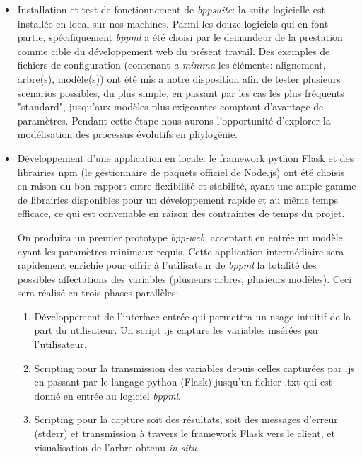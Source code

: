 \begin{itemize}
	\item Installation et test de fonctionnement de \textit{bppsuite}: la suite logicielle est installée en local sur nos machines. 
	Parmi les douze logiciels qui en font partie, spécifiquement   \textit{bppml} a été choisi par le demandeur de la prestation comme cible 
	du développement web du présent travail. Des exemples de fichiers de configuration (contenant \textit{a minima} les éléments: alignement, arbre(s), modèle(s)) 
	ont été mis a notre disposition  
	afin de tester plusieurs scenarios possibles, du plus simple, en passant par les cas les plus fréquents "standard", 
	jusqu'aux modèles plus exigeantes comptant d'avantage de paramètres. Pendant cette étape nous aurons l'opportunité d'explorer
	 la modélisation des processus évolutifs en phylogénie.
	
	\item Développement d'une application en locale: le framework python Flask et des librairies npm
	(le gestionnaire de paquets officiel de Node.js) 
	ont été choisis en raison du bon rapport entre flexibilité et stabilité, 
	ayant une ample gamme de librairies disponibles pour un développement rapide et au même temps efficace, 
	ce qui est convenable en raison des contraintes de temps du projet.

	On produira un premier prototype  \textit{bpp-web}, acceptant en entrée un modèle ayant les paramètres minimaux requis. 
	Cette application intermédiaire sera rapidement enrichie pour offrir à l'utilisateur de \textit{bppml} la totalité des possibles affectations 
	des variables (plusieurs arbres, plusieurs modèles).
	Ceci sera réalisé en trois phases parallèles:
	\begin{enumerate}
		\item Développement de l'interface entrée qui permettra un usage intuitif de la part du utilisateur. 
		Un script .js capture les variables insérées par l'utilisateur. 
		\item Scripting pour la transmission des variables depuis celles capturées par .js en passant par le langage 
		python (Flask) jusqu'un fichier .txt qui est donné en entrée au logiciel \textit{bppml}.
		\item Scripting pour la capture soit des résultats, soit des messages d'erreur (stderr) et transmission à travers 
		le framework Flask vers le client, et visualisation de l'arbre obtenu \textit{in situ}. 
	\end{enumerate}
	

\end{itemize}
